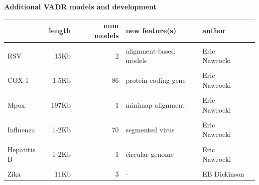 \documentclass[landscape]{slides}
\begin{document}
\begin{slide}
\begin{center}
  \textbf{Additional VADR models and development}

\small
\begin{tabular}{l|r|r|l|l|l}
 & length & num models & new feature(s) & author\\ \hline
 & & & & & \\ 
RSV & 15Kb & 2 & alignment-based models & Eric Nawrocki \\
 & & & & & \\ 
COX-1 & 1.5Kb & 86 & protein-coding gene & Eric Nawrocki \\
 & & & & & \\ 
Mpox & 197Kb & 1 & minimap alignment & Eric Nawrocki \\
 & & & & & \\ 
Influenza & 1-2Kb & 70 & segmented virus & Eric Nawrocki \\
 & & & & & \\ 
Hepatitis B & 1-2Kb & 1 & circular genome & Eric Nawrocki \\
 & & & & & \\ 
Zika      & 11Kb & 3 & - & EB Dickinson \\
\end{tabular}


\end{center}
  \vfill
\end{slide}
\end{document}
